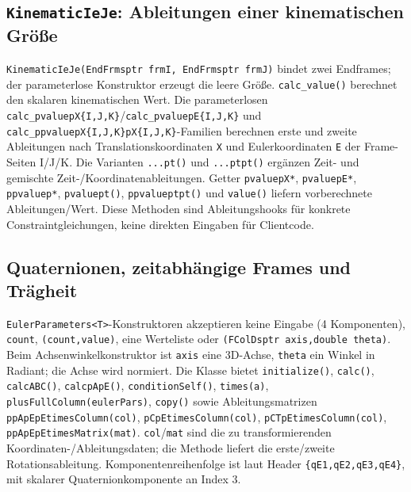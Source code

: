 \documentclass[
  12pt
]{book}
\begin{document}
\hypertarget{kinematicieje-ableitungen-einer-kinematischen-gruxf6uxdfe}{%
\subsection*{\texorpdfstring{\texttt{KinematicIeJe}: Ableitungen einer
kinematischen
Größe}{KinematicIeJe: Ableitungen einer kinematischen Größe}}\label{kinematicieje-ableitungen-einer-kinematischen-gruxf6uxdfe}}

\texttt{KinematicIeJe(EndFrmsptr\ frmI,\ EndFrmsptr\ frmJ)} bindet zwei
Endframes; der parameterlose Konstruktor erzeugt die leere Größe.
\texttt{calc\_value()} berechnet den skalaren kinematischen Wert. Die
parameterlosen
\texttt{calc\_pvaluepX\{I,J,K\}}/\texttt{calc\_pvaluepE\{I,J,K\}} und
\texttt{calc\_ppvaluepX\{I,J,K\}pX\{I,J,K\}}-Familien berechnen erste
und zweite Ableitungen nach Translationskoordinaten \texttt{X} und
Eulerkoordinaten \texttt{E} der Frame-Seiten I/J/K. Die Varianten
\texttt{...pt()} und \texttt{...ptpt()} ergänzen Zeit- und gemischte
Zeit-/Koordinatenableitungen. Getter \texttt{pvaluepX*},
\texttt{pvaluepE*}, \texttt{ppvaluep*}, \texttt{pvaluept()},
\texttt{ppvalueptpt()} und \texttt{value()} liefern vorberechnete
Ableitungen/Wert. Diese Methoden sind Ableitungshooks für konkrete
Constraintgleichungen, keine direkten Eingaben für Clientcode.

\hypertarget{quaternionen-zeitabhuxe4ngige-frames-und-truxe4gheit}{%
\subsection*{Quaternionen, zeitabhängige Frames und
Trägheit}\label{quaternionen-zeitabhuxe4ngige-frames-und-truxe4gheit}}

\texttt{EulerParameters\textless{}T\textgreater{}}-Konstruktoren
akzeptieren keine Eingabe (4 Komponenten), \texttt{count},
\texttt{(count,value)}, eine Werteliste oder
\texttt{(FColDsptr\ axis,double\ theta)}. Beim Achsenwinkelkonstruktor
ist \texttt{axis} eine 3D-Achse, \texttt{theta} ein Winkel in Radiant;
die Achse wird normiert. Die Klasse bietet \texttt{initialize()},
\texttt{calc()}, \texttt{calcABC()}, \texttt{calcpApE()},
\texttt{conditionSelf()}, \texttt{times(a)},
\texttt{plusFullColumn(eulerPars)}, \texttt{copy()} sowie
Ableitungsmatrizen \texttt{ppApEpEtimesColumn(col)},
\texttt{pCpEtimesColumn(col)}, \texttt{pCTpEtimesColumn(col)},
\texttt{ppApEpEtimesMatrix(mat)}. \texttt{col}/\texttt{mat} sind die zu
transformierenden Koordinaten-/Ableitungsdaten; die Methode liefert die
erste/zweite Rotationsableitung. Komponentenreihenfolge ist laut Header
\texttt{\{qE1,qE2,qE3,qE4\}}, mit skalarer Quaternionkomponente an Index
3.
\end{document}
